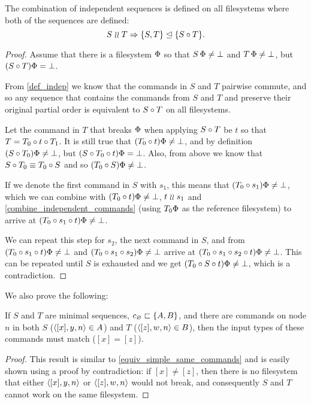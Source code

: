\begin{mylem}\label{combine_independent_sequences}
The combination of independent sequences is defined on all filesystems
where both of the sequences are defined:
\[ S\mathrel{\wr\wr} T \Rightarrow {\{S,T\}}\trianglelefteq{\{S\circ T\}}. \]
\end{mylem}
\begin{proof}
Assume that there is a filesystem $\Phi$ so that
$S\,\Phi\neq\bot$ and $T\,\Phi\neq\bot$, but
$(S\circ T)\Phi=\bot$.

From \cref{def_indep} we know that
the commands in $S$ and $T$ pairwise commute, and so any sequence
that contains the commands from $S$ and $T$ and preserve their original partial order
is equivalent to $S\circ T$ on all filesystems.

Let the command in $T$ that breaks $\Phi$ when applying $S\circ T$ be $t$
so that $T=T_0\circ t\circ T_1$.
It is still true that $(T_0 \circ t)\Phi\neq\bot$,
and by definition $(S\circ T_0)\Phi\neq\bot$,
but $(S\circ T_0\circ t)\Phi=\bot$.
Also, from above we know that $S\circ T_0\equiv T_0\circ S$
and so $(T_0 \circ S)\Phi\neq\bot$.

If we denote the first command in $S$ with $s_1$,
this means that $(T_0 \circ s_1)\Phi\neq\bot$,
which we can combine with $(T_0 \circ t)\Phi\neq\bot$, $t\mathrel{\wr\wr} s_1$ and
\cref{combine_independent_commands}
(using $T_0\Phi$ as the reference filesystem)
to arrive at $(T_0 \circ s_1\circ t)\Phi\neq\bot$.

We can repeat this step for $s_2$, the next command in $S$,
and from 
$(T_0 \circ s_1\circ t)\Phi\neq\bot$
and
$(T_0 \circ s_1\circ s_2)\Phi\neq\bot$
arrive at
$(T_0 \circ s_1\circ s_2\circ t)\Phi\neq\bot$.
This can be repeated until $S$ is exhausted and we get
$(T_0 \circ S\circ t)\Phi\neq\bot$, which is a contradiction.
\end{proof}

We also prove the following:

\begin{mylem}\label{worksinputmatch}
If $S$ and $T$ are minimal sequences, $c_\varnothing\sqsubset{\{A,B\}}$,
and there are commands on node $n$ in both $S$ ($\langle{[x],y,n}\rangle\in A$) and $T$ ($\langle{[z],w,n}\rangle\in B$),
then the input types of these commands must match ($[x]=[z]$).
\end{mylem}
\begin{proof}
This result is similar to \cref{equiv_simple_same_commands} and
is easily shown using a proof by contradiction: if $[x]\neq [z]$, then there is no filesystem that
either $\langle{[x],y,n}\rangle$ or $\langle{[z],w,n}\rangle$ would not break, 
and consequently $S$ and $T$ cannot work on the same filesystem.
\end{proof}



